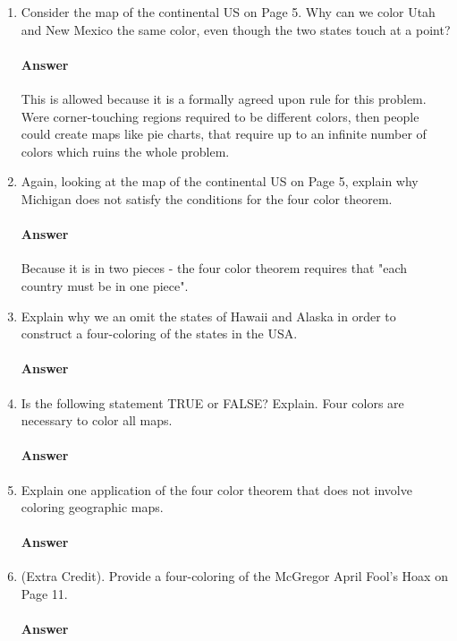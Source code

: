 \documentclass{article}
\begin{document}
\begin{enumerate}

    \item Consider the map of the continental US on Page 5.  Why can we color
        Utah and New Mexico the same color, even though the two states touch at
        a point?

        \paragraph{Answer}
        This is allowed because it is a formally agreed upon rule for this problem. Were corner-touching regions required to be different colors, then people could create maps like pie charts, that require up to an infinite number of colors which ruins the whole problem.

    \item Again, looking at the map of the continental US on Page 5, explain why
        Michigan does not satisfy the conditions for the four color theorem.

        \paragraph{Answer}
        Because it is in two pieces - the four color theorem requires that "each country must be in one piece".

    \item Explain why we an omit the states of Hawaii and Alaska in order to
        construct a four-coloring of the states in the USA.

        \paragraph{Answer}

    \item Is the following statement TRUE or FALSE?  Explain. Four colors are
        necessary to color all maps.

        \paragraph{Answer}

    \item Explain one application of the four color theorem that does not
        involve coloring geographic maps.

        \paragraph{Answer}

    \item (Extra Credit). Provide a four-coloring of the McGregor April Fool's
        Hoax on Page 11.

        \paragraph{Answer}

\end{enumerate}
\end{document}
